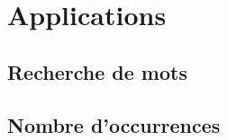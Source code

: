 \section{Applications}
\subsection{Recherche de mots}
\setcounter{thequestion}{0}

\subsection{Nombre d'occurrences}
\setcounter{thequestion}{0}

